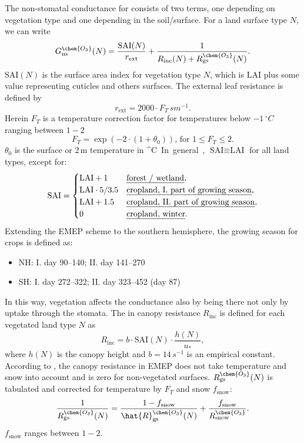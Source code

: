 \documentclass[gmd, manuscript]{copernicus}
\begin{document}
The non-stomatal conductance for  consists of two terms, one depending on vegetation type and one depending in the soil/surface. For a land surface type $N$, we can write
\begin{equation}
  G_\text{ns}^\chem{O_3}(N) = \frac{\text{SAI}(N)}{r_\text{ext}} + \frac{1}{R_\text{inc}(N) + R_\text{gs}^\chem{O_3}(N)}.
\end{equation}
$\text{SAI}(N)$ is the surface area index for vegetation type $N$, which is $\text{LAI}$ plus some value representing cuticles and others surfaces. The external leaf resistance is defined by
\begin{equation}
  r_\text{ext} = 2000\cdot F_T\,\unit{sm^{-1}}.
\end{equation}
Herein $F_T$ is a temperature correction factor for temperatures below $-1\,\unit{^\circ C}$ ranging between $1-2$
\begin{equation}
  F_T = \exp{(-2\cdot(1+\theta_0))}\text{, for }1 \leq F_T \leq 2.
\end{equation}
$\theta_0$ is the surface or 2\,\unit{m} temperature in \unit{^\circ C}. In general, $\text{SAI} \equiv \text{LAI}$ for all land types, except for: 
%
\begin{equation}
  \text{SAI} = 
  \begin{cases}
    \text{LAI}+1 & \text{\emph{forest / wetland}},\\
    \text{LAI}\cdot 5/3.5 & \text{\emph{cropland, I. part of growing season}},\\
    \text{LAI} + 1.5 & \text{\emph{cropland, II. part of growing season}},\\
    0 & \text{\emph{cropland, winter}}.
  \end{cases}
\end{equation}
%
Extending the EMEP scheme to the southern hemisphere, the growing season for crops is defined as:
\begin{itemize}
\item[] NH: I. day 90--140; II. day 141--270
\item[] SH: I. day 272--322; II. day 323--452 (day 87)
\end{itemize}

In this way, vegetation affects the conductance also by being there not only by uptake through the stomata. The in canopy resistance $R_\text{inc}$ is defined for each vegetated land type $N$ as
\begin{equation}
  R_\text{inc} = b \cdot \text{SAI}(N) \cdot \frac{h(N)}{u_*},
\end{equation}
where $h(N)$ is the canopy height and $b = 14\,\unit{s^{-1}}$ is an empirical constant. According to \citet{ACP:Simpson2012}, the canopy resistance in EMEP does not take temperature and snow into account and is zero for non-vegetated surfaces. $R_\text{gs}^\chem{O_3}(N)$ is tabulated and corrected for temperature by $F_T$ and snow $f_\text{snow}$:
\begin{equation}
  \frac{1}{R_\text{gs}^\chem{O_3}(N)} = \frac{1-f_\text{snow}}{\hat{R}_\text{gs}^\chem{O_3}(N)} + \frac{f_\text{snow}}{R_\text{snow}^\chem{O_3}}.
\end{equation}
$f_\text{snow}$ ranges between $1-2$.
\end{document}
